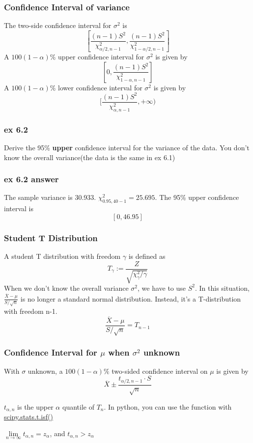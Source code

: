 \documentclass{beamer}
\begin{document}
\begin{frame}
    \frametitle{Confidence Interval of variance}
    The two-side confidence interval for $\sigma^2$ is
    \[[\frac{(n-1)S^2}{\chi_{\alpha/2,n-1}^2},\frac{(n-1)S^2}{\chi_{1-\alpha/2,n-1}^2}]\]
    A $100(1-\alpha)\%$ upper confidence interval for $\sigma^2$ is given by
    \[[0,\frac{(n-1)S^2}{\chi_{1-\alpha,n-1}^2}]\]
    A $100(1-\alpha)\%$ lower confidence interval for $\sigma^2$ is given by
    \[[\frac{(n-1)S^2}{\chi_{\alpha,n-1}^2},+\infty)\]
    

\end{frame}

\begin{frame}
    \frametitle{ex 6.2}
    Derive the 95\% \textbf{upper} confidence interval for the variance of the data. You don't know the overall variance(the data is the same in ex 6.1)
    

\end{frame}

\begin{frame}
    \frametitle{ex 6.2 answer}
    The sample variance is 30.933. $\chi^2_{0.95,40-1}=25.695$. The 95\% upper confidence interval is 
    \[[0,46.95]\]

\end{frame}

\begin{frame}
    \frametitle{Student T Distribution}
    A student T distribution with freedom $\gamma$ is defined as
    \[T_{\gamma}:=\frac{Z}{\sqrt{\chi^2_{\gamma}/\gamma}}\]
    When we don't know the overall variance $\sigma^2$, we have to use $S^2$. In this situation, $\frac{\overline{X}-\mu}{S/\sqrt{n}}$ is no longer a standard normal distribution. Instead, it's a T-distribution with freedom n-1.
    \[\frac{\overline{X}-\mu}{S/\sqrt{n}}=T_{n-1}\]

\end{frame}

\begin{frame}
    \frametitle{Confidence Interval for $\mu$ when $\sigma^2$ unknown}
    With $\sigma$ unknown, a $100(1-\alpha)\%$ two-sided confidence interval on $\mu$ is given by\[
    \overline{X}\pm\frac{t_{\alpha/2,n-1}\cdot S}{\sqrt{n}}\]

    $t_{\alpha,n}$ is the upper $\alpha$ quantile of $T_{n}$. In python, you can use the function with \href{https://docs.scipy.org/doc/scipy/reference/generated/scipy.stats.t.html}{scipy.stats.t.isf()}

    $\lim\limits_{n\to\infty}t_{\alpha,n}=z_{\alpha}$, and $t_{\alpha,n}>z_{\alpha}$
    

\end{frame}
\end{document}
